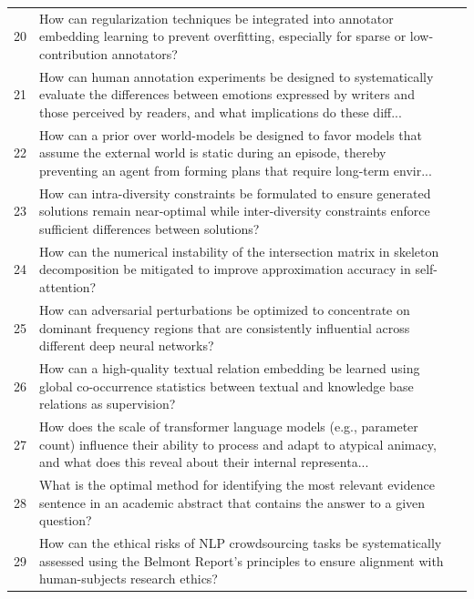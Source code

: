 \begin{longtable}{@{}p{0.5cm}p{7.2cm}p{2.5cm}@{}}
20 & How can regularization techniques be integrated into annotator embedding learning to prevent overfitting, especially for sparse or low-contribution annotators? & \cite{10.18653/v1/2024.naacl-long.407} \\
21 & How can human annotation experiments be designed to systematically evaluate the differences between emotions expressed by writers and those perceived by readers, and what implications do these diff... & \cite{10.18653/v1/2021.findings-emnlp.219} \\
22 & How can a prior over world-models be designed to favor models that assume the external world is static during an episode, thereby preventing an agent from forming plans that require long-term envir... & \cite{10.1609/aaai.v34i03.5628} \\
23 & How can intra-diversity constraints be formulated to ensure generated solutions remain near-optimal while inter-diversity constraints enforce sufficient differences between solutions? & \cite{10.1609/aaai.v34i02.5512} \\
24 & How can the numerical instability of the intersection matrix in skeleton decomposition be mitigated to improve approximation accuracy in self-attention? & \cite{10.1609/aaai.v36i1.19962} \\
25 & How can adversarial perturbations be optimized to concentrate on dominant frequency regions that are consistently influential across different deep neural networks? & \cite{10.1609/aaai.v38i6.28427} \\
26 & How can a high-quality textual relation embedding be learned using global co-occurrence statistics between textual and knowledge base relations as supervision? & \cite{10.18653/v1/p19-1127} \\
27 & How does the scale of transformer language models (e.g., parameter count) influence their ability to process and adapt to atypical animacy, and what does this reveal about their internal representa... & \cite{10.18653/v1/2023.emnlp-main.744} \\
28 & What is the optimal method for identifying the most relevant evidence sentence in an academic abstract that contains the answer to a given question? & \cite{10.1609/aaai.v33i01.33019855} \\
29 & How can the ethical risks of NLP crowdsourcing tasks be systematically assessed using the Belmont Report’s principles to ensure alignment with human-subjects research ethics? & \cite{10.18653/v1/2021.naacl-main.295} \\

\end{longtable}
